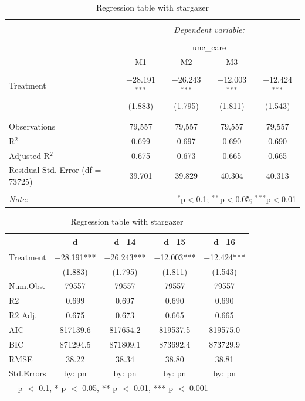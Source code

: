\documentclass[
]{article}
\begin{document}
\begin{table}[H] \centering 
  \caption{Regression table with stargazer} 
  \label{tab2} 
\begin{tabular}{@{\extracolsep{5pt}}lcccc} 
\\[-1.8ex]\hline 
\hline \\[-1.8ex] 
 & \multicolumn{4}{c}{\textit{Dependent variable:}} \\ 
\cline{2-5} 
\\[-1.8ex] & \multicolumn{4}{c}{unc\_care} \\ 
 & M1 & M2 & M3 &  \\ 
\hline \\[-1.8ex] 
 Treatment & $-$28.191$^{***}$ & $-$26.243$^{***}$ & $-$12.003$^{***}$ & $-$12.424$^{***}$ \\ 
  & (1.883) & (1.795) & (1.811) & (1.543) \\ 
  & & & & \\ 
\hline \\[-1.8ex] 
Observations & 79,557 & 79,557 & 79,557 & 79,557 \\ 
R$^{2}$ & 0.699 & 0.697 & 0.690 & 0.690 \\ 
Adjusted R$^{2}$ & 0.675 & 0.673 & 0.665 & 0.665 \\ 
Residual Std. Error (df = 73725) & 39.701 & 39.829 & 40.304 & 40.313 \\ 
\hline 
\hline \\[-1.8ex] 
\textit{Note:}  & \multicolumn{4}{r}{$^{*}$p$<$0.1; $^{**}$p$<$0.05; $^{***}$p$<$0.01} \\ 
\end{tabular} 
\end{table}

\begin{table}

\caption{\label{tab:table-4}Regression table with stargazer}
\centering
\begin{tabular}[t]{lcccc}
\toprule
  & d & d\_14 & d\_15 & d\_16\\
\midrule
Treatment & \num{-28.191}*** & \num{-26.243}*** & \num{-12.003}*** & \num{-12.424}***\\
 & (\num{1.883}) & (\num{1.795}) & (\num{1.811}) & (\num{1.543})\\
\midrule
Num.Obs. & \num{79557} & \num{79557} & \num{79557} & \num{79557}\\
R2 & \num{0.699} & \num{0.697} & \num{0.690} & \num{0.690}\\
R2 Adj. & \num{0.675} & \num{0.673} & \num{0.665} & \num{0.665}\\
AIC & \num{817139.6} & \num{817654.2} & \num{819537.5} & \num{819575.0}\\
BIC & \num{871294.5} & \num{871809.1} & \num{873692.4} & \num{873729.9}\\
RMSE & \num{38.22} & \num{38.34} & \num{38.80} & \num{38.81}\\
Std.Errors & by: pn & by: pn & by: pn & by: pn\\
\bottomrule
\multicolumn{5}{l}{\rule{0pt}{1em}+ p $<$ 0.1, * p $<$ 0.05, ** p $<$ 0.01, *** p $<$ 0.001}\\
\end{tabular}
\end{table}
\end{document}
